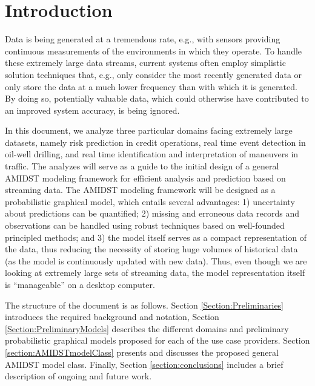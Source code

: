 \section{Introduction}

Data is being generated at a tremendous rate, e.g., with sensors providing continuous measurements of the environments in which they operate. To handle these extremely large data streams, current systems often employ simplistic solution techniques that, e.g., only consider the most recently generated data or only store the data at a much lower frequency than with which it is generated. By doing so, potentially valuable data, which could otherwise have contributed to an improved system accuracy, is being ignored. 

In this document, we analyze three particular domains facing extremely large datasets, namely risk prediction in credit
operations, real time event detection in oil-well drilling, and real time identification and interpretation of maneuvers
in traffic. The analyzes will serve as a guide to the initial design of a general AMIDST modeling framework for efficient analysis and prediction based on streaming data. The AMIDST modeling
framework will be designed as a probabilistic graphical model, which entails several advantages: 1) uncertainty about
predictions can be quantified; 2) missing and erroneous data records and observations can be handled using robust
techniques based on well-founded principled methods; and 3) the model itself serves as a compact representation of the
data, thus reducing the necessity of storing huge volumes of historical data (as the model is continuously updated with
new data). Thus, even though we are looking at extremely
large sets of streaming data, the model representation itself is ``manageable'' on a desktop computer.  

The structure of the document is as follows. Section \ref{Section:Preliminaries} introduces the required background and
notation, Section \ref{Section:PreliminaryModels} describes the different domains and preliminary probabilistic graphical models proposed for each of the use case providers. Section \ref{section:AMIDSTmodelClass} presents and discusses the proposed general AMIDST model class. Finally, Section \ref{section:conclusions} includes a brief description of ongoing and future work.